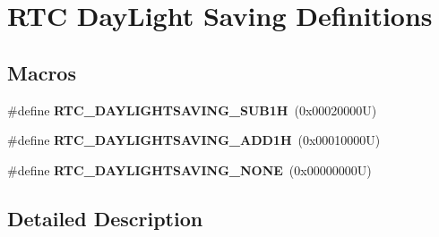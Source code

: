 \hypertarget{group___r_t_c___day_light_saving___definitions}{}\section{R\+TC Day\+Light Saving Definitions}
\label{group___r_t_c___day_light_saving___definitions}
\subsection*{Macros}
\begin{DoxyCompactItemize}
\item 
\mbox{\label{group___r_t_c___day_light_saving___definitions_ga7ccaea4cb9cb5fbd21b97dce1e2e887d}} 
\#define {\bfseries R\+T\+C\+\_\+\+D\+A\+Y\+L\+I\+G\+H\+T\+S\+A\+V\+I\+N\+G\+\_\+\+S\+U\+B1H}~(0x00020000\+U)
\item 
\mbox{\label{group___r_t_c___day_light_saving___definitions_gabd374c3ce0fb1b3ec96a3a71155151ae}} 
\#define {\bfseries R\+T\+C\+\_\+\+D\+A\+Y\+L\+I\+G\+H\+T\+S\+A\+V\+I\+N\+G\+\_\+\+A\+D\+D1H}~(0x00010000\+U)
\item 
\mbox{\label{group___r_t_c___day_light_saving___definitions_gafef31f6f6d924dededc4589d2dd16a5c}} 
\#define {\bfseries R\+T\+C\+\_\+\+D\+A\+Y\+L\+I\+G\+H\+T\+S\+A\+V\+I\+N\+G\+\_\+\+N\+O\+NE}~(0x00000000\+U)
\end{DoxyCompactItemize}


\subsection{Detailed Description}
